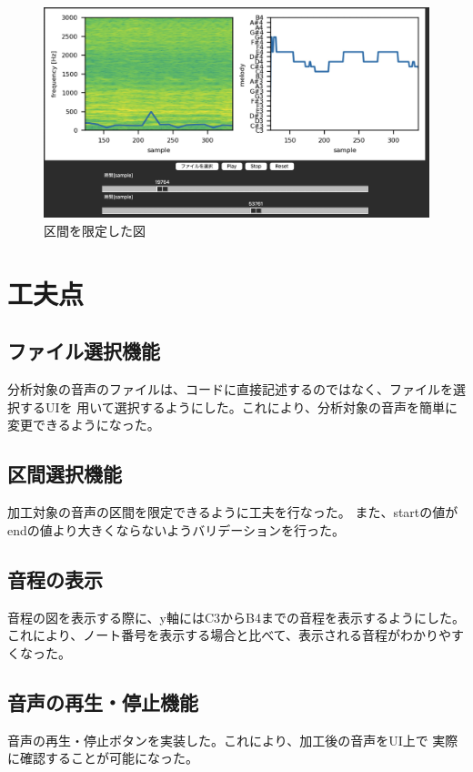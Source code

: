 \documentclass[a4paper,11pt]{jsarticle}
\begin{document}
\begin{figure}[h]
\centering
\includegraphics[keepaspectratio, width=13cm]
{./images/filtered_figures.jpg}
\caption{区間を限定した図}
\label{fig:filtered_figures}
\end{figure}

\section{工夫点}
\subsection{ファイル選択機能}
分析対象の音声のファイルは、コードに直接記述するのではなく、ファイルを選択するUIを
用いて選択するようにした。これにより、分析対象の音声を簡単に変更できるようになった。

\subsection{区間選択機能}
加工対象の音声の区間を限定できるように工夫を行なった。
また、startの値がendの値より大きくならないようバリデーションを行った。

\subsection{音程の表示}
音程の図を表示する際に、y軸にはC3からB4までの音程を表示するようにした。
これにより、ノート番号を表示する場合と比べて、表示される音程がわかりやすくなった。

\subsection{音声の再生・停止機能}
音声の再生・停止ボタンを実装した。これにより、加工後の音声をUI上で
実際に確認することが可能になった。
\end{document}
